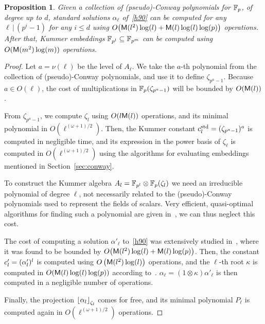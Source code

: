 \documentclass[sigconf]{acmart}
\newtheorem{proposition}[theorem]{Proposition}
\begin{document}
\begin{proposition}
  Given a collection of (pseudo)-Conway polynomials for $\mathbb{F}_p$, of
  degree up to $d$, standard solutions $\alpha_\ell$ of~\eqref{h90} can
  be computed for any $\ell\,|\,(p^i-1)$ for any $i\le d$ using
  $O\bigr(\mathsf{M}(l^2)\log(l) + \mathsf{M}(l)\log(l)\log(p)\bigl)$ %
  operations. %
  After that, Kummer embeddings $\mathbb{F}_{p^l}\subseteq\mathbb{F}_{p^m}$ can be
  computed using $O(\mathsf{M}(m^2)\log(m))$ operations.
\end{proposition}
\begin{proof}
  Let $a=\nu(\ell)$ be the level of $A_\ell$. We take the $a$-th
  polynomial from the collection of (pseudo)-Conway polynomials, and
  use it to define $\zeta_{p^a-1}$. %
  Because $a\in O(\ell)$, the cost of multiplications in
  $\mathbb{F}_p(\zeta_{p^a-1})$ will be bounded by $O(\mathsf{M}(l))$.

  From $\zeta_{p^a-1}$, we compute $\zeta_l$ using $O(l\mathsf{M}(l))$
  operations, and its minimal polynomial in
  $O(\ell^{(\omega+1)/2})$. %
  Then, the Kummer constant $c^{\mathrm{std}}_l=(\zeta_{p^a-1})^a$ is computed
  in negligible time, and its expression in the power basis of
  $\zeta_\ell$ is computed in $O(\ell^{(\omega+1)/2})$ using the
  algorithms for evaluating embeddings mentioned in
  Section~\ref{sec:conway}.

  To construct the Kummer algebra
  $A_l=\mathbb{F}_{p^l}\otimes\mathbb{F}_p(\zeta_l)$ we need an irreducible
  polynomial of degree $\ell$, not necessarily related to the
  (pseudo)-Conway polynomials used to represent the fields of
  scalars. %
  Very efficient, quasi-optimal algorithms for finding such a
  polynomial are given
  in~\cite{BoFlSaSc06,couveignes+lercier11,DeDoSc13}, we can thus
  neglect this cost.
  
  The cost of computing a solution $\alpha'_\ell$ to~\eqref{h90} was
  extensively studied in~\cite{brieulle2018computing}, where it was
  found to be bounded by
  $O\bigr(\mathsf{M}(l^2)\log(l) + \mathsf{M}(l)\log(p)\bigl)$. %
  Then, the constant $c'_l=(\alpha'_l)^l$ is computed using
  $O\left(\mathsf{M}(l^2)\log(l)\right)$ operations, and the $\ell$-th root
  $\kappa$ is computed in $O(\mathsf{M}(l)\log(l)\log(p))$ according
  to~\cite{brieulle2018computing}. %
  $\alpha_\ell=(1\otimes\kappa)\alpha'_\ell$ is then computed in a
  negligible number of operations.

  Finally, the projection $\left\lfloor \alpha_l \right\rfloor_{\zeta_l}$ comes for
  free, and its minimal polynomial $P_\ell$ is computed again in
  $O(\ell^{(\omega+1)/2})$ operations.


\end{proof}
\end{document}
